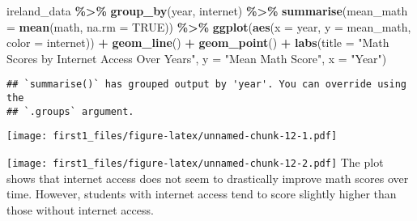 \documentclass[
]{article}
\newenvironment{Shaded}{\begin{snugshade}}{\end{snugshade}}
\newcommand{\AttributeTok}[1]{\textcolor[rgb]{0.13,0.29,0.53}{#1}}
\newcommand{\CommentTok}[1]{\textcolor[rgb]{0.56,0.35,0.01}{\textit{#1}}}
\newcommand{\ConstantTok}[1]{\textcolor[rgb]{0.56,0.35,0.01}{#1}}
\newcommand{\FunctionTok}[1]{\textcolor[rgb]{0.13,0.29,0.53}{\textbf{#1}}}
\newcommand{\NormalTok}[1]{#1}
\newcommand{\OtherTok}[1]{\textcolor[rgb]{0.56,0.35,0.01}{#1}}
\newcommand{\SpecialCharTok}[1]{\textcolor[rgb]{0.81,0.36,0.00}{\textbf{#1}}}
\newcommand{\StringTok}[1]{\textcolor[rgb]{0.31,0.60,0.02}{#1}}
\begin{document}
\begin{Shaded}
\begin{Highlighting}[]
\NormalTok{ireland\_data }\SpecialCharTok{\%\textgreater{}\%}
  \FunctionTok{group\_by}\NormalTok{(year, internet) }\SpecialCharTok{\%\textgreater{}\%}
  \FunctionTok{summarise}\NormalTok{(}\AttributeTok{mean\_math =} \FunctionTok{mean}\NormalTok{(math, }\AttributeTok{na.rm =} \ConstantTok{TRUE}\NormalTok{)) }\SpecialCharTok{\%\textgreater{}\%}
  \FunctionTok{ggplot}\NormalTok{(}\FunctionTok{aes}\NormalTok{(}\AttributeTok{x =}\NormalTok{ year, }\AttributeTok{y =}\NormalTok{ mean\_math, }\AttributeTok{color =}\NormalTok{ internet)) }\SpecialCharTok{+}
  \FunctionTok{geom\_line}\NormalTok{() }\SpecialCharTok{+} \FunctionTok{geom\_point}\NormalTok{() }\SpecialCharTok{+}
  \FunctionTok{labs}\NormalTok{(}\AttributeTok{title =} \StringTok{"Math Scores by Internet Access Over Years"}\NormalTok{, }\AttributeTok{y =} \StringTok{"Mean Math Score"}\NormalTok{, }\AttributeTok{x =} \StringTok{"Year"}\NormalTok{)}
\end{Highlighting}
\end{Shaded}

\begin{verbatim}
## `summarise()` has grouped output by 'year'. You can override using the
## `.groups` argument.
\end{verbatim}

\texttt{[image: first1\_files/figure-latex/unnamed-chunk-12-1.pdf]}

\begin{Shaded}
\end{Shaded}

\texttt{[image: first1\_files/figure-latex/unnamed-chunk-12-2.pdf]} The
plot shows that internet access does not seem to drastically improve
math scores over time. However, students with internet access tend to
score slightly higher than those without internet access.
\end{document}

